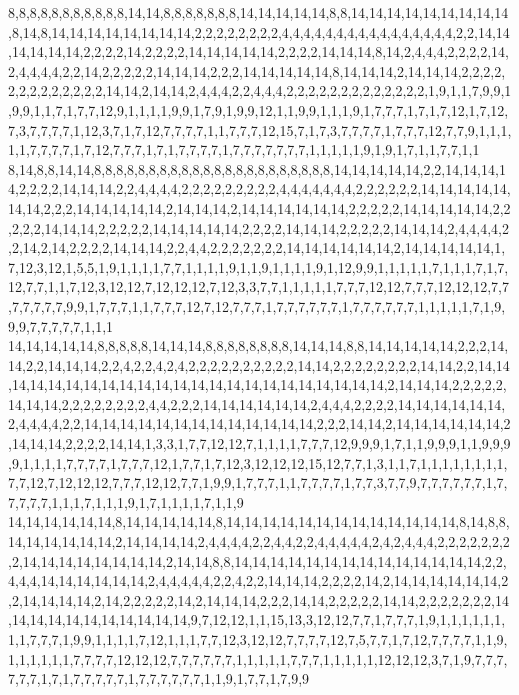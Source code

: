 8,8,8,8,8,8,8,8,8,8,8,14,14,8,8,8,8,8,8,8,14,14,14,14,14,8,8,14,14,14,14,14,14,14,14,14,8,14,8,14,14,14,14,14,14,14,14,2,2,2,2,2,2,2,2,4,4,4,4,4,4,4,4,4,4,4,4,4,4,4,4,2,2,14,14,14,14,14,14,2,2,2,2,14,2,2,2,2,14,14,14,14,14,2,2,2,2,14,14,14,8,14,2,4,4,4,2,2,2,2,14,2,4,4,4,4,2,2,14,2,2,2,2,2,14,14,14,2,2,2,14,14,14,14,14,8,14,14,14,2,14,14,14,2,2,2,2,2,2,2,2,2,2,2,2,2,14,14,2,14,14,2,4,4,4,2,2,4,4,4,2,2,2,2,2,2,2,2,2,2,2,2,2,1,9,1,1,7,9,9,1,9,9,1,1,7,1,7,7,12,9,1,1,1,1,9,9,1,7,9,1,9,9,12,1,1,9,9,1,1,1,9,1,7,7,7,1,7,1,7,12,1,7,12,7,3,7,7,7,7,1,12,3,7,1,7,12,7,7,7,7,1,1,7,7,7,12,15,7,1,7,3,7,7,7,7,1,7,7,7,12,7,7,9,1,1,1,1,1,7,7,7,7,1,7,12,7,7,7,1,7,1,7,7,7,7,1,7,7,7,7,7,7,7,1,1,1,1,1,9,1,9,1,7,1,1,7,7,1,1
8,14,8,8,14,14,8,8,8,8,8,8,8,8,8,8,8,8,8,8,8,8,8,8,8,8,8,8,14,14,14,14,14,2,2,14,14,14,14,2,2,2,2,14,14,14,2,2,4,4,4,4,2,2,2,2,2,2,2,2,2,4,4,4,4,4,4,4,2,2,2,2,2,2,14,14,14,14,14,14,14,2,2,2,14,14,14,14,14,2,14,14,14,2,14,14,14,14,14,14,2,2,2,2,2,14,14,14,14,14,2,2,2,2,2,14,14,14,2,2,2,2,2,14,14,14,14,14,2,2,2,2,14,14,14,2,2,2,2,2,14,14,14,2,4,4,4,4,2,2,14,2,14,2,2,2,2,14,14,14,2,2,4,4,2,2,2,2,2,2,2,14,14,14,14,14,14,2,14,14,14,14,14,1,7,12,3,12,1,5,5,1,9,1,1,1,1,7,7,1,1,1,1,9,1,1,9,1,1,1,1,9,1,12,9,9,1,1,1,1,1,7,1,1,1,7,1,7,12,7,7,1,1,7,12,3,12,12,7,12,12,12,7,12,3,3,7,7,1,1,1,1,1,7,7,7,12,12,7,7,7,12,12,12,7,7,7,7,7,7,7,9,9,1,7,7,7,1,1,7,7,7,12,7,12,7,7,7,1,7,7,7,7,7,7,1,7,7,7,7,7,7,1,1,1,1,1,7,1,9,9,9,7,7,7,7,7,1,1,1
14,14,14,14,14,8,8,8,8,8,14,14,14,8,8,8,8,8,8,8,8,14,14,14,8,8,14,14,14,14,14,2,2,2,14,14,2,2,14,14,14,2,2,4,2,2,4,2,4,2,2,2,2,2,2,2,2,2,2,14,14,2,2,2,2,2,2,2,2,14,14,2,2,14,14,14,14,14,14,14,14,14,14,14,14,14,14,14,14,14,14,14,14,14,14,14,2,14,14,14,2,2,2,2,2,14,14,14,2,2,2,2,2,2,2,2,4,4,2,2,2,14,14,14,14,14,14,2,4,4,4,2,2,2,2,14,14,14,14,14,14,2,4,4,4,4,2,2,14,14,14,14,14,14,14,14,14,14,14,14,14,2,2,2,14,14,2,14,14,14,14,14,14,2,14,14,14,2,2,2,2,14,14,1,3,3,1,7,7,12,12,7,1,1,1,1,7,7,7,12,9,9,9,1,7,1,1,9,9,9,1,1,9,9,9,9,1,1,1,1,7,7,7,7,1,7,7,7,12,1,7,7,1,7,12,3,12,12,12,15,12,7,7,1,3,1,1,7,1,1,1,1,1,1,1,1,7,7,12,7,12,12,12,7,7,7,12,12,7,7,1,9,9,1,7,7,7,1,1,7,7,7,7,1,7,7,3,7,7,9,7,7,7,7,7,7,1,7,7,7,7,7,1,1,1,7,1,1,1,9,1,7,1,1,1,1,7,1,1,9
14,14,14,14,14,14,8,14,14,14,14,14,8,14,14,14,14,14,14,14,14,14,14,14,14,14,8,14,8,8,14,14,14,14,14,14,2,14,14,14,14,2,4,4,4,4,2,2,4,4,2,2,4,4,4,4,4,2,4,2,4,4,4,2,2,2,2,2,2,2,2,14,14,14,14,14,14,14,14,2,14,14,8,8,14,14,14,14,14,14,14,14,14,14,14,14,14,14,2,2,4,4,4,14,14,14,14,14,14,2,4,4,4,4,4,2,2,4,2,2,14,14,14,2,2,2,2,14,2,14,14,14,14,14,14,2,2,14,14,14,14,2,14,2,2,2,2,2,14,2,14,14,14,2,2,2,14,14,2,2,2,2,2,14,14,2,2,2,2,2,2,2,14,14,14,14,14,14,14,14,14,14,14,9,7,12,12,1,1,15,13,3,12,12,7,7,1,7,7,7,1,9,1,1,1,1,1,1,1,1,7,7,7,1,9,9,1,1,1,1,7,12,1,1,1,7,7,12,3,12,12,7,7,7,7,12,7,5,7,7,1,7,12,7,7,7,7,1,1,9,1,1,1,1,1,1,7,7,7,7,12,12,12,7,7,7,7,7,7,1,1,1,1,1,7,7,7,1,1,1,1,1,12,12,12,3,7,1,9,7,7,7,7,7,7,1,7,1,7,7,7,7,7,1,7,7,7,7,7,7,1,1,9,1,7,7,1,7,9,9
